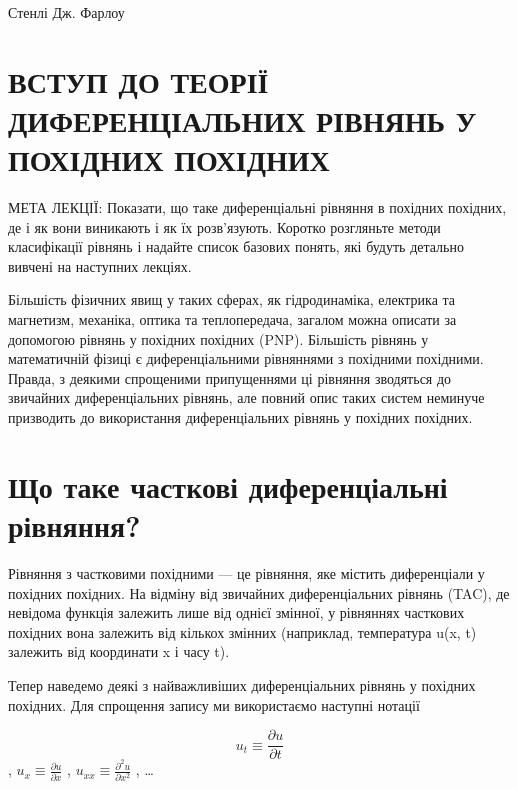 \documentclass[
  ukrainian,
]{article}
\begin{document}
Стенлі Дж. Фарлоу

\section{ВСТУП ДО ТЕОРІЇ ДИФЕРЕНЦІАЛЬНИХ РІВНЯНЬ У ПОХІДНИХ
ПОХІДНИХ}\label{ux432ux441ux442ux443ux43f-ux434ux43e-ux442ux435ux43eux440ux456ux457-ux434ux438ux444ux435ux440ux435ux43dux446ux456ux430ux43bux44cux43dux438ux445-ux440ux456ux432ux43dux44fux43dux44c-ux443-ux43fux43eux445ux456ux434ux43dux438ux445-ux43fux43eux445ux456ux434ux43dux438ux445}

МЕТА ЛЕКЦІЇ: Показати, що таке диференціальні рівняння в похідних
похідних, де і як вони виникають і як їх розв'язують. Коротко розгляньте
методи класифікації рівнянь і надайте список базових понять, які будуть
детально вивчені на наступних лекціях.

Більшість фізичних явищ у таких сферах, як гідродинаміка, електрика та
магнетизм, механіка, оптика та теплопередача, загалом можна описати за
допомогою рівнянь у похідних похідних (PNP). Більшість рівнянь у
математичній фізиці є диференціальними рівняннями з похідними похідними.
Правда, з деякими спрощеними припущеннями ці рівняння зводяться до
звичайних диференціальних рівнянь, але повний опис таких систем неминуче
призводить до використання диференціальних рівнянь у похідних похідних.

\section{Що таке часткові диференціальні
рівняння?}\label{ux449ux43e-ux442ux430ux43aux435-ux447ux430ux441ux442ux43aux43eux432ux456-ux434ux438ux444ux435ux440ux435ux43dux446ux456ux430ux43bux44cux43dux456-ux440ux456ux432ux43dux44fux43dux43dux44f}

Рівняння з частковими похідними --- це рівняння, яке містить
диференціали у похідних похідних. На відміну від звичайних
диференціальних рівнянь (TAC), де невідома функція залежить лише від
однієї змінної, у рівняннях часткових похідних вона залежить від кількох
змінних (наприклад, температура u(x, t) залежить від координати x і часу
t).

Тепер наведемо деякі з найважливіших диференціальних рівнянь у похідних
похідних. Для спрощення запису ми використаємо наступні нотації

\[u_t \equiv \frac{\partial u}{\partial t}\],
\(u_x \equiv \frac{\partial u}{\partial x}\) ,
\(u_{xx} \equiv \frac{\partial^2 u}{\partial x^2}\) , \ldots{}
\end{document}
